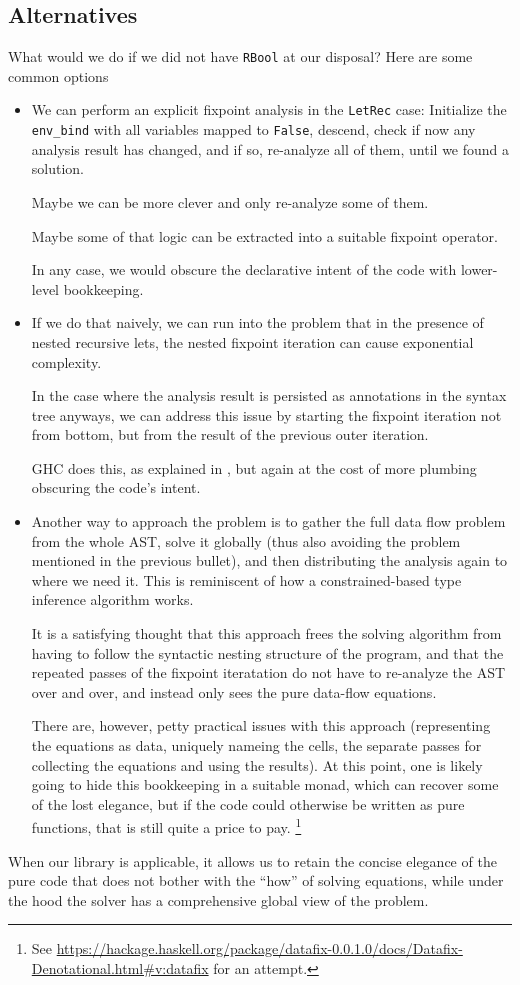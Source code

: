 \documentclass[manuscript,anonymous,screen,acmsmall]{acmart}
\begin{document}
\subsection{Alternatives}
What would we do if we did not have \verb|RBool| at our disposal? Here are some common options
\begin{itemize}
\item We can perform an explicit fixpoint analysis in the \verb|LetRec| case: Initialize the \verb|env_bind| with all variables mapped to \verb|False|, descend, check if now any analysis result has changed, and if so, re-analyze all of them, until we found a solution.

Maybe we can be more clever and only re-analyze some of them.

Maybe some of that logic can be extracted into a suitable fixpoint operator.

In any case, we would obscure the declarative intent of the code with lower-level bookkeeping.

\item If we do that naively, we can run into the problem that in the presence of nested recursive lets, the nested fixpoint iteration can cause exponential complexity.

In the case where the analysis result is persisted as annotations in the syntax tree anyways, we can address this issue by starting the fixpoint iteration not from bottom, but from the result of the previous outer iteration.

GHC does this, as explained in \citet[Section 6.6]{modular}, but again at the cost of more plumbing obscuring the code's intent.

\item Another way to approach the problem is to gather the full data flow problem from the whole AST, solve it globally (thus also avoiding the problem mentioned in the previous bullet), and then distributing the analysis again to where we need it. This is reminiscent of how a constrained-based type inference algorithm works.

It is a satisfying thought that this approach frees the solving algorithm from having to follow the syntactic nesting structure of the program, and that the repeated passes of the fixpoint iteratation do not have to re-analyze the AST over and over, and instead only sees the pure data-flow equations.

There are, however, petty practical issues with this approach (representing the equations as data, uniquely nameing the cells, the separate passes for collecting the equations and using the results).
At this point, one is likely going to hide this bookkeeping in a suitable monad, which can recover some of the lost elegance, but if the code could otherwise be written as pure functions, that is still quite a price to pay.%
\footnote{See \url{https://hackage.haskell.org/package/datafix-0.0.1.0/docs/Datafix-Denotational.html\#v:datafix} for an attempt.}
\end{itemize}
When our library is applicable, it allows us to retain the concise elegance of the pure code that does not bother with the “how” of solving equations, while under the hood the solver has a comprehensive global view of the problem.
\end{document}
